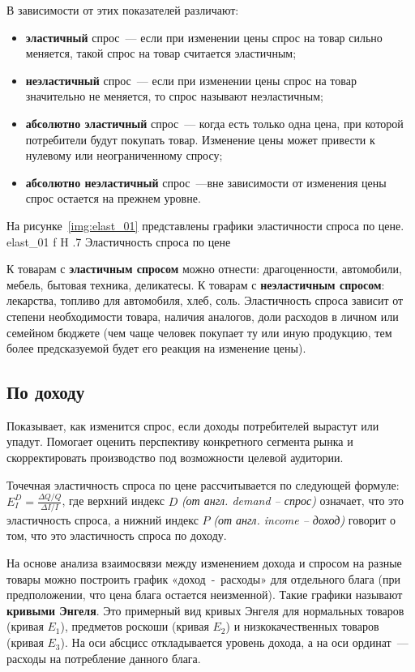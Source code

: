 В зависимости от этих показателей различают:
\begin{itemize}
	\item \textbf{эластичный }спрос~--- если при изменении цены спрос на товар сильно меняется, такой спрос на товар считается эластичным;
	\item \textbf{неэластичный }спрос~--- если при изменении цены спрос на товар значительно не меняется, то спрос называют неэластичным;
	\item \textbf{абсолютно эластичный} спрос~--- когда есть только одна цена, при которой потребители будут покупать товар. 
	Изменение цены может привести к нулевому или неограниченному спросу;
	\item \textbf{абсолютно неэластичный} спрос~---вне зависимости от изменения цены спрос остается на прежнем уровне. 
\end{itemize}

На рисунке~\ref{img:elast_01} представлены графики эластичности спроса по цене.
{elast_01}
{f}
{H}
{.7\textwidth}
{Эластичность спроса по цене~\cite{elast1}}

К товарам с \textbf{эластичным спросом} можно отнести: драгоценности, автомобили, мебель, бытовая техника, деликатесы. 
К товарам с \textbf{неэластичным спросом}: лекарства, топливо для автомобиля, хлеб, соль. 
Эластичность спроса зависит от степени необходимости товара, наличия аналогов, доли расходов в личном или семейном бюджете (чем чаще человек покупает ту или иную продукцию, тем более предсказуемой будет его реакция на изменение цены).


\subsection{По доходу}
Показывает, как изменится спрос, если доходы потребителей вырастут или упадут. 
Помогает оценить перспективу конкретного сегмента рынка и скорректировать производство под возможности целевой аудитории.

Точечная эластичность спроса по цене рассчитывается по следующей формуле: $E_{I}^{D}=\frac{\Delta Q/Q}{\Delta I/I}$,
где верхний индекс $D$ \textit{(от англ. demand -- спрос)} означает, что это эластичность спроса, а нижний индекс $P$ \textit{(от англ. income -- доход)} говорит о том, что это эластичность спроса по доходу.

На основе анализа взаимосвязи между изменением дохода и спросом на разные товары можно построить график «доход~-~расходы» для отдельного блага (при предположении, что цена блага остается неизменной). 
Такие графики называют \textbf{кривыми Энгеля}. 
Это примерный вид кривых Энгеля для нормальных товаров (кривая $E_{1}$), предметов роскоши (кривая $E_{2}$) и низкокачественных товаров (кривая $E_{3}$). 
На оси абсцисс откладывается уровень дохода, а на оси ординат~--- расходы на потребление данного блага. 

